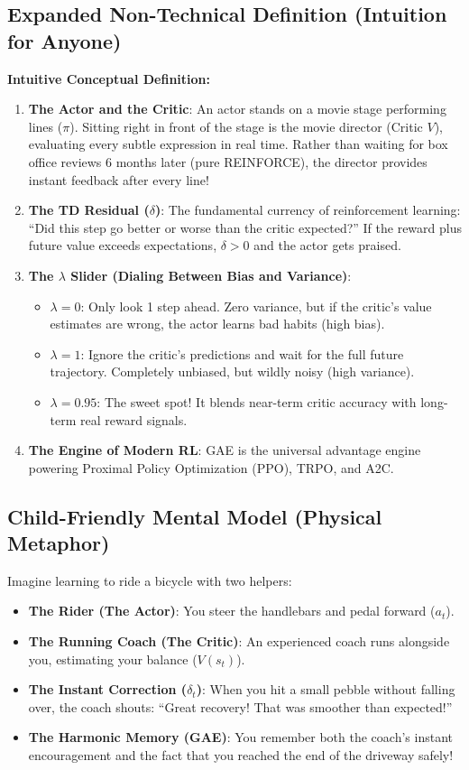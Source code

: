 \documentclass[11pt,a4paper]{article}
\theoremstyle{definition}
\begin{document}
\subsection{Expanded Non-Technical Definition (Intuition for Anyone)}
\textbf{Intuitive Conceptual Definition:}
\begin{enumerate}
    \item \textbf{The Actor and the Critic}: An actor stands on a movie stage performing lines ($\pi$). Sitting right in front of the stage is the movie director (Critic $V$), evaluating every subtle expression in real time. Rather than waiting for box office reviews 6 months later (pure REINFORCE), the director provides instant feedback after every line!
    \item \textbf{The TD Residual ($\delta$)}: The fundamental currency of reinforcement learning: ``Did this step go better or worse than the critic expected?'' If the reward plus future value exceeds expectations, $\delta > 0$ and the actor gets praised.
    \item \textbf{The $\lambda$ Slider (Dialing Between Bias and Variance)}:
    \begin{itemize}
        \item $\lambda = 0$: Only look 1 step ahead. Zero variance, but if the critic's value estimates are wrong, the actor learns bad habits (high bias).
        \item $\lambda = 1$: Ignore the critic's predictions and wait for the full future trajectory. Completely unbiased, but wildly noisy (high variance).
        \item $\lambda = 0.95$: The sweet spot! It blends near-term critic accuracy with long-term real reward signals.
    \end{itemize}
    \item \textbf{The Engine of Modern RL}: GAE is the universal advantage engine powering Proximal Policy Optimization (PPO), TRPO, and A2C.
\end{enumerate}

\subsection{Child-Friendly Mental Model (Physical Metaphor)}
Imagine learning to ride a bicycle with two helpers:
\begin{itemize}
    \item \textbf{The Rider (The Actor)}: You steer the handlebars and pedal forward ($a_t$).
    \item \textbf{The Running Coach (The Critic)}: An experienced coach runs alongside you, estimating your balance ($V(s_t)$).
    \item \textbf{The Instant Correction ($\delta_t$)}: When you hit a small pebble without falling over, the coach shouts: ``Great recovery! That was smoother than expected!''
    \item \textbf{The Harmonic Memory (GAE)}: You remember both the coach's instant encouragement and the fact that you reached the end of the driveway safely!
\end{itemize}
\end{document}
